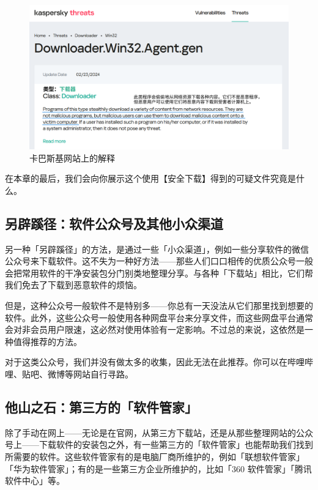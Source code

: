 \begin{figure}[htb!]
  \centering
  \includegraphics[width=.9\textwidth]{assets/basic/Kaspersky_website_warning.png}
  \caption{卡巴斯基网站上的解释}
  \label{fig:Kaspersky_website_warning}
\end{figure}

在本章的最后，我们会向你展示这个使用【安全下载】得到的可疑文件究竟是什么。

\subsection{另辟蹊径：软件公众号及其他小众渠道}

另一种「另辟蹊径」的方法，是通过一些「小众渠道」，例如一些分享软件的微信公众号来下载软件。这不失为一种好方法——那些人们口口相传的优质公众号一般会把常用软件的干净安装包分门别类地整理分享。与各种「下载站」相比，它们帮我们免去了下载到恶意软件的烦恼。

但是，这种公众号一般软件不是特别多——你总有一天没法从它们那里找到想要的软件。此外，这些公众号一般使用各种网盘平台来分享文件，而这些网盘平台通常会对非会员用户限速，这必然对使用体验有一定影响。不过总的来说，这依然是一种值得推荐的方法。

\begin{note}
  对于这类公众号，我们并没有做太多的收集，因此无法在此推荐。你可以在哔哩哔哩、贴吧、微博等网站自行寻路。
\end{note}

\subsection{他山之石：第三方的「软件管家」}

除了手动在网上——无论是在官网，从第三方下载站，还是从那些整理网站的公众号上——下载软件的安装包之外，有一些第三方的「软件管家」也能帮助我们找到所需要的软件。这些软件管家有的是电脑厂商所维护的，例如「联想软件管家」「华为软件管家」；有的是一些第三方企业所维护的，比如「360 软件管家」「腾讯软件中心」等。

